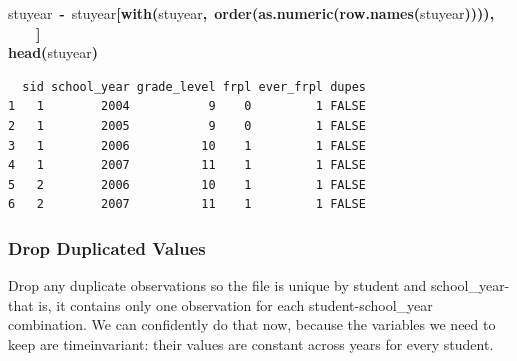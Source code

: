 \documentclass[12pt]{article}
\makeatletter
\newcommand{\hlfunctioncall}[1]{\textcolor[rgb]{0.501960784313725,0,0.329411764705882}{\textbf{#1}}}%
\newcommand{\hlkeyword}[1]{\textcolor[rgb]{0,0,0}{\textbf{#1}}}%
\newcommand{\hlassignement}[1]{\textcolor[rgb]{0,0,0}{\textbf{#1}}}%
\newcommand{\hlsymbol}[1]{\textcolor[rgb]{0,0,0}{#1}}%
\newcommand{\hlstd}[1]{\textcolor[rgb]{0,0,0}{#1}}%
\newenvironment{kframe}{%
 \def\FrameCommand##1{\hskip\@totalleftmargin \hskip-\fboxsep
 \colorbox{shadecolor}{##1}\hskip-\fboxsep
     \hskip-\linewidth \hskip-\@totalleftmargin \hskip\columnwidth}%
 \MakeFramed {\advance\hsize-\width
   \@totalleftmargin\z@ \linewidth\hsize
   \@setminipage}}%
 {\par\unskip\endMakeFramed}
\newenvironment{knitrout}{}{} %
\renewenvironment{knitrout}{\begin{footnotesize}}{\end{footnotesize}}
\makeatother
\begin{document}
\begin{knitrout}
\begin{kframe}
\begin{flushleft}
\hlstd{}\hlsymbol{stuyear}{\ }\hlassignement{\usebox{\hlnormalsizeboxlessthan}-}{\ }\hlsymbol{stuyear}\hlkeyword{[}\hlfunctioncall{with}\hlkeyword{(}\hlsymbol{stuyear}\hlkeyword{,}{\ }\hlfunctioncall{order}\hlkeyword{(}\hlfunctioncall{as.numeric}\hlkeyword{(}\hlfunctioncall{row.names}\hlkeyword{(}\hlsymbol{stuyear}\hlkeyword{)}\hlkeyword{)}\hlkeyword{)}\hlkeyword{)}\hlkeyword{,}\hspace*{\fill}\\
\hlstd{}{\ }{\ }{\ }{\ }\hlkeyword{]}\hspace*{\fill}\\
\hlstd{}\hlfunctioncall{head}\hlkeyword{(}\hlsymbol{stuyear}\hlkeyword{)}\mbox{}
\normalfont
\end{flushleft}
\begin{verbatim}
  sid school_year grade_level frpl ever_frpl dupes
1   1        2004           9    0         1 FALSE
2   1        2005           9    0         1 FALSE
3   1        2006          10    1         1 FALSE
4   1        2007          11    1         1 FALSE
5   2        2006          10    1         1 FALSE
6   2        2007          11    1         1 FALSE
\end{verbatim}
\end{kframe}
\end{knitrout}


\subsubsection{Drop Duplicated Values}
Drop any duplicate observations so the file is unique by student and school\_year-that is, it contains only one observation 
for each student-school\_year combination. We can confidently do that now, because the variables we need to keep are timeinvariant: their values are constant across years for every student.
\end{document}
